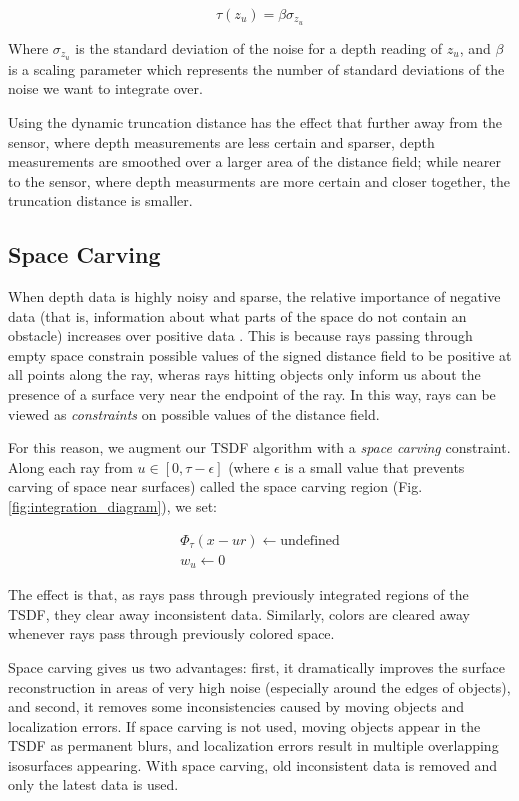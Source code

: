 \documentclass[conference,10pt]{IEEEtran}
\begin{document}
$$ \tau(z_u) = \beta\sigma_{z_u}$$

Where $\sigma_{z_u}$ is the standard deviation of the noise for a depth reading
of $z_u$, and $\beta$ is a scaling parameter which represents the number of
standard deviations of the noise we want to integrate over.

Using the dynamic truncation distance has the effect that further away from the
sensor, where depth measurements are less certain and sparser, depth
measurements are smoothed over a larger area of the distance field; while nearer
to the sensor, where depth measurments are more certain and closer together, the
truncation distance is smaller.

\subsection{Space Carving}
\label{section:carving}
When depth data is highly noisy and sparse, the relative importance of negative
data (that is, information about what parts of the space do not contain an
obstacle) increases over positive data \cite{Klingensmith2014}. This is because
rays passing through empty space constrain possible values of the signed
distance field to be positive at all points along the ray, wheras rays hitting
objects only inform us about the presence of a surface very near the endpoint of
the ray. In this way, rays can be viewed as \textit{constraints} on possible
values of the distance field.

For this reason, we augment our TSDF algorithm with a \textit{space carving}
constraint. Along each ray from $u \in [0, \tau - \epsilon]$ (where $\epsilon$
is a small value that prevents carving of space near surfaces) called the space
carving region (Fig. \ref{fig:integration_diagram}), we set:

\begin{align*}
\Phi_{\tau}(x - ur) \gets \text{undefined}
\\
%
w_u \gets 0
\end{align*}

\noindent  The effect is that, as rays pass through previously integrated
regions of the TSDF, they clear away inconsistent data. Similarly, colors are
cleared away whenever rays pass through previously colored space.

Space carving gives us two advantages: first, it dramatically improves the
surface reconstruction in areas of very high noise (especially around the edges
of objects), and second, it removes some inconsistencies caused by moving
objects and localization errors. If space carving is not used, moving objects
appear in the TSDF as permanent blurs, and localization errors result in
multiple overlapping isosurfaces appearing. With space carving, old inconsistent
data is removed and only the latest data is used.
\end{document}
